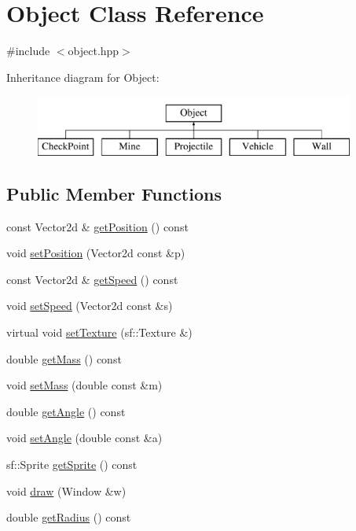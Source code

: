 \hypertarget{classObject}{}\section{Object Class Reference}
\label{classObject}


{\ttfamily \#include $<$object.\+hpp$>$}

Inheritance diagram for Object\+:\begin{figure}[H]
\begin{center}
\leavevmode
\includegraphics[height=2.000000cm]{classObject}
\end{center}
\end{figure}
\subsection*{Public Member Functions}
\begin{DoxyCompactItemize}
\item 
const Vector2d \& \hyperlink{classObject_ab498ce65ce8cb69bb806081e65f19cd6}{get\+Position} () const
\item 
void \hyperlink{classObject_a03d47d414e9638846de79b4f15cda00f}{set\+Position} (Vector2d const \&p)
\item 
const Vector2d \& \hyperlink{classObject_a0c3105820f784f07a6d20e019a8311a6}{get\+Speed} () const
\item 
void \hyperlink{classObject_a34421c57b89f3c9c6e0de44c98469585}{set\+Speed} (Vector2d const \&s)
\item 
virtual void \hyperlink{classObject_a3b23ad400ac8a7133fb470daa4e67467}{set\+Texture} (sf\+::\+Texture \&)
\item 
double \hyperlink{classObject_ac53341c11f7435033434bc3b6c908f0c}{get\+Mass} () const
\item 
void \hyperlink{classObject_a07221bb6a7c823b993005f8a0d3cd7a1}{set\+Mass} (double const \&m)
\item 
double \hyperlink{classObject_a9958ed5111be9373ef97cb20d00b625f}{get\+Angle} () const
\item 
void \hyperlink{classObject_a7e69ebba88f99341baf4d046be6493f1}{set\+Angle} (double const \&a)
\item 
sf\+::\+Sprite \hyperlink{classObject_add7c5a02624a3dbdf856517b18fce61f}{get\+Sprite} () const
\item 
void \hyperlink{classObject_a4da149ed27dfef04d62cb2fa6315af1c}{draw} (Window \&w)
\item 
double \hyperlink{classObject_a3d76eb87b30cfd6c9812a2d85a26b187}{get\+Radius} () const
\end{DoxyCompactItemize}

